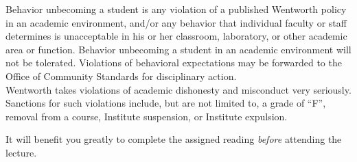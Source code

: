 \documentclass{wit_syllabus}
\begin{document}
\SyllabusAcademicSupport

\SyllabusAcademicHonesty


Behavior unbecoming a student is any violation of a published Wentworth policy in an academic environment, and/or any behavior that individual faculty or staff determines is unacceptable in his or her classroom, laboratory, or other academic area or function. 
Behavior unbecoming a student in an academic environment will not be tolerated. 
Violations of behavioral expectations may be forwarded to the Office of Community Standards for disciplinary action.
\\

Wentworth takes violations of academic dishonesty and misconduct very seriously. 
Sanctions for such violations include, but are not limited to, a grade of ``F'', removal from a course, Institute suspension, or Institute expulsion.

\SyllabusDisability

\SyllabusCOF



It will benefit you greatly to complete the assigned reading \textit{before} attending the lecture.
\\

\begin{SyllabusSchedule}
\end{SyllabusSchedule}
\end{document}
